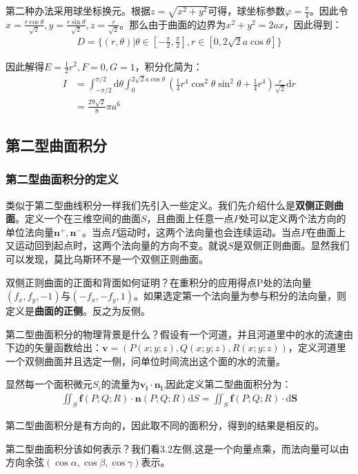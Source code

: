 \documentclass{ctexart}
\let\oldtextbf\textbf
\renewcommand{\textbf}[1]{\textcolor{brown!50!red}{\oldtextbf{#1}}}
\begin{document}
第二种办法采用球坐标换元。根据$z=\sqrt{x^2+y^2}$可得，球坐标参数$\varphi=\frac{\pi}{4}$。因此令$x=\frac{r\cos\theta}{\sqrt{2}},y=\frac{r\sin\theta}{\sqrt{2}},z=\frac{r}{\sqrt{2}}$。那么由于曲面的边界为$x^2+y^2=2ax$，因此得到：
\begin{align*}
    D=\{(r,\theta)| \theta\in[-\frac{\pi}{2},\frac{\pi}{2}],r\in[0,2\sqrt{2}a\cos\theta]\}
\end{align*}

因此解得$E=\frac{1}{2}r^2,F=0,G=1$，积分化简为：
\begin{align*}
    I&=\int_{-\pi/2}^{\pi/2}\mathrm{d}\theta\int_0^{2\sqrt{2}a\cos\theta}(\frac{1}{4}r^4\cos^2\theta\sin^2\theta+\frac{1}{4}r^4)\frac{r}{\sqrt{2}}\mathrm{d}r\\
    &=\frac{29\sqrt{2}}{8}\pi a^6
\end{align*}
\subsection{第二型曲面积分}
\subsubsection{第二型曲面积分的定义}
类似于第二型曲线积分一样我们先引入一些定义。我们先介绍什么是\textbf{\color{brown!50!red}双侧正则曲面}。定义一个在三维空间的曲面$S$，且曲面上任意一点$P$处可以定义两个法方向的单位法向量$\bm{n}^+,\bm{n}^-$。当点$P$运动时，这两个法向量也会连续运动。当点$P$在曲面上又运动回到起点时，这两个法向量的方向不变。就说$S$是双侧正则曲面。显然我们可以发现，莫比乌斯环不是一个双侧正则曲面。

双侧正则曲面的正面和背面如何证明？在重积分的应用得点P处的法向量$(f_x,f_y,-1)$与$(-f_x,-f_y,1)$。如果选定第一个法向量为参与积分的法向量，则定义是\textbf{\color{brown!50!red}曲面的正侧}。反之为反侧。

第二型曲面积分的物理背景是什么？假设有一个河道，并且河道里中的水的流速由下边的矢量函数给出：$\bm{v}=(P(x;y;z),Q(x;y;z),R(x;y;z))$，定义河道里一个双侧曲面并且选定一侧，问单位时间流出这个面的水的流量。

显然每一个面积微元$S_i$的流量为$\bm{v_i}\cdot \bm{n_i}$,因此定义第二型曲面积分为：
\begin{align*}
\iint_S \bm{f} (P;Q;R)\cdot \bm{n}(P;Q;R) \mathrm{d}S = 
\iint_S \bm{f} (P;Q;R)\cdot  \mathrm{d}\bm{S}\tag{3-2} 
\end{align*}

第二型曲面积分是有方向的，因此取不同的面积分，得到的结果是相反的。

第二型曲面积分该如何表示？我们看3.2左侧,这是一个向量点乘，而法向量可以由方向余弦$(\cos\alpha,\cos\beta,\cos\gamma)$表示。
\end{document}
